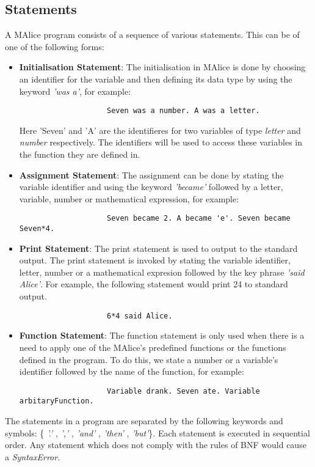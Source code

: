 \documentclass[a4wide, 11pt]{article}
\begin{document}
	\subsection{Statements}
	\label{sec:statements}
		A MAlice program consists of a sequence of various statements. This can be of one of the following forms:
		\begin{itemize}
			\item {\bf Initialisation Statement}: The initialisation in MAlice is done by choosing an identifier
		 		for the variable and then defining its data type by using the keyword \emph{'was a'}, for example:
				\begin{verbatim}
					Seven was a number. A was a letter.
				\end{verbatim}
				Here 'Seven' and 'A' are the identifieres for two variables of type 
				\emph{letter} and \emph{number} respectively. The identifiers will be 
				used to access these variables in the function they are defined in. 
			\item {\bf Assignment Statement}: The assignment can be done by stating the 
				variable identifier and using the keyword \emph{'became'} followed by a letter, variable, number or 
				mathematical expression, for example:  
				\begin{verbatim}
					Seven became 2. A became 'e'. Seven became Seven*4.
				\end{verbatim}
			\item {\bf Print Statement}: The print statement is used to output to the standard output. 
				The print statement is invoked by stating the variable identifier, letter, number
				or a mathematical expresion followed by the key phrase \emph{'said Alice'}. For example, the following statement
				would print 24 to standard output.
				\begin{verbatim}
					6*4 said Alice.
				\end{verbatim}
			\item {\bf Function Statement}: The function statement is only used when there is a need to apply 
				one of the MAlice's predefined functions or the functions defined in the program. To do this, we state a number or a variable's identifier 
				followed by the name of the function, for example:
				\begin{verbatim}
					Variable drank. Seven ate. Variable arbitaryFunction.
				\end{verbatim}
		\end{itemize}
		The statements in a program are separated by the following keywords and symbols: 
		\{ \emph{'.'} , \emph{','} , \emph{'and'} , \emph{'then'} , \emph{'but'}\}.
		Each statement is executed in sequential order. Any statement which does not comply with
		the rules of BNF would cause a \emph{SyntaxError}.
\end{document}
